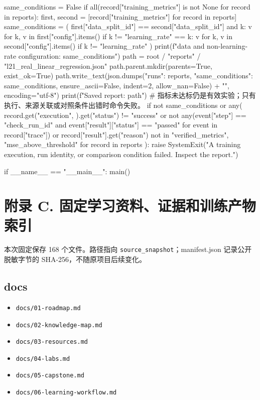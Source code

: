 \begin{Code}
    same_conditions = False
    if all(record["training_metrics"] is not None for record in reports):
        first, second = [record["training_metrics"] for record in reports]
        same_conditions = (
            first["data_split_id"] == second["data_split_id"]
            and {k: v for k, v in first["config"].items() if k != "learning_rate"}
            == {k: v for k, v in second["config"].items() if k != "learning_rate"}
        )
    print(f"\nSame data and non-learning-rate configuration: {same_conditions}")
    path = root / "reports" / "l21_real_linear_regression.json"
    path.parent.mkdir(parents=True, exist_ok=True)
    path.write_text(json.dumps({"runs": reports, "same_conditions": same_conditions},
                               ensure_ascii=False, indent=2, allow_nan=False) + "\n", encoding="utf-8")
    print(f"Saved report: {path}")
    # 指标未达标仍是有效实验；只有执行、来源关联或对照条件出错时命令失败。
    if not same_conditions or any(
        record.get("execution", {}).get("status") != "success"
        or not any(event["step"] == "check_run_id" and event["result"]["status"] == "passed"
                   for event in record["trace"])
        or record["result"].get("reason") not in {"verified_metrics", "mse_above_threshold"}
        for record in reports
    ):
        raise SystemExit("A training execution, run identity, or comparison condition failed. Inspect the report.")


if __name__ == "__main__":
    main()
\end{Code}

\section{附录 C. 固定学习资料、证据和训练产物索引}
本次固定保存 168 个文件。路径指向 \nolinkurl{source_snapshot}；manifest.json 记录公开脱敏字节的 SHA-256，不随原项目后续变化。

\subsection{docs}
\begin{itemize}
\item \nolinkurl{docs/01-roadmap.md}
\item \nolinkurl{docs/02-knowledge-map.md}
\item \nolinkurl{docs/03-resources.md}
\item \nolinkurl{docs/04-labs.md}
\item \nolinkurl{docs/05-capstone.md}
\item \nolinkurl{docs/06-learning-workflow.md}
\end{itemize}

